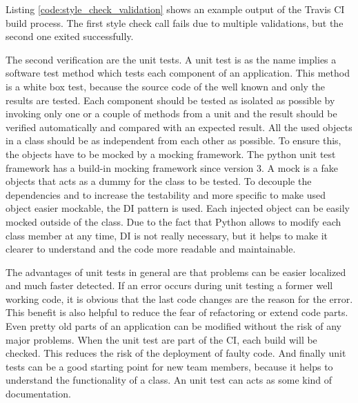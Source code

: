 Listing \ref{code:style_check_validation} shows an example output of the Travis \ac{CI} build process.
The first style check call fails due to multiple validations, but the second one exited successfully.\newline

The second verification are the unit tests.
A unit test is as the name implies a software test method which tests each component of an application.
This method is a white box test, because the source code of the well known and only the results are tested.
Each component should be tested as isolated as possible by invoking only one or a couple of methods from a unit and the result should be verified automatically and compared with an expected result.\autocite[cf.][p. 320]{Olan:2003:UTT}
All the used objects in a class should be as independent from each other as possible.
To ensure this, the objects have to be mocked by a mocking framework.
The python unit test framework has a build-in mocking framework since version 3.
A mock is a fake objects that acts as a dummy for the class to be tested.
To decouple the dependencies and to increase the testability and more specific to make used object easier mockable, the \ac{DI} pattern is used.
Each injected object can be easily mocked outside of the class.
Due to the fact that Python allows to modify each class member at any time, \ac{DI} is not really necessary, but it helps to make it clearer to understand and the code more readable and maintainable.\newline

The advantages of unit tests in general are that problems can be easier localized and much faster detected.
If an error occurs during unit testing a former well working code, it is obvious that the last code changes are the reason for the error.
This benefit is also helpful to reduce the fear of refactoring or extend code parts.
Even pretty old parts of an application can be modified without the risk of any major problems.
When the unit test are part of the \ac{CI}, each build will be checked.
This reduces the risk of the deployment of faulty code.
And finally unit tests can be a good starting point for new team members, because it helps to understand the functionality of a class.
An unit test can acts as some kind of documentation.\newline

